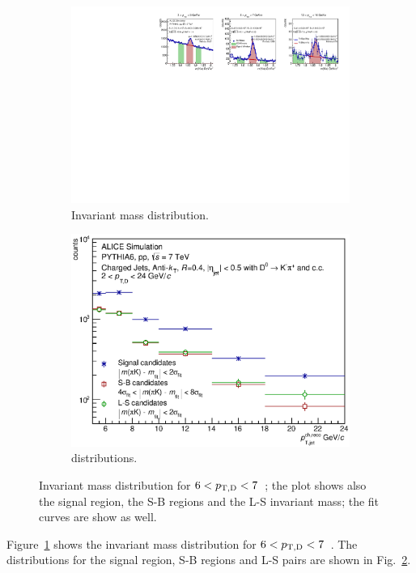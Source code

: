 \begin{figure}[tbh]
\centering
\begin{subfigure}{0.49\textwidth}
  \centering
  \includegraphics[width=1.0\linewidth]{img/HQ16_Simulation_InvMassSB}
  \caption{Invariant mass distribution.}
  \label{fig:HQ16_Simulation_InvMassSB}
\end{subfigure}
\begin{subfigure}{0.49\textwidth}
  \centering
  \includegraphics[width=1.0\linewidth]{img/HQ16_Simulation_Spectra_SB_LS}
  \caption{\ptchjet distributions.}
  \label{fig:HQ16_Simulation_Spectra_SB_LS}
\end{subfigure}
\caption{Invariant mass distribution for $6 < p_{\mathrm{T,D}} < 7$~\GeVc; the plot shows also the signal region, the S-B regions and the L-S invariant mass; the fit curves are show as well.}
\label{fig:InvMass}
\end{figure}
Figure~\ref{fig:HQ16_Simulation_InvMassSB} shows the invariant mass distribution for $6 < p_{\mathrm{T,D}} < 7$~\GeVc. 
The \ptchjet distributions for the signal region, S-B regions and L-S pairs are shown in Fig.~\ref{fig:HQ16_Simulation_Spectra_SB_LS}.

